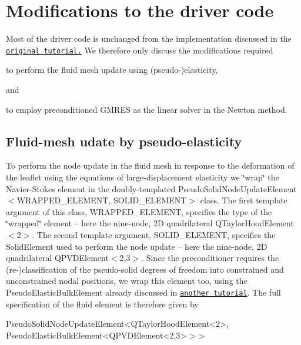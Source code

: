  

\hypertarget{index_modifications}{}\section{Modifications to the driver code}\label{index_modifications}
Most of the driver code is unchanged from the implementation discussed in the \href{../../../interaction/fsi_channel_with_leaflet/html/index.html}{\tt original tutorial.} We therefore only discuss the modifications required
\begin{DoxyItemize}
\item to perform the fluid mesh update using (pseudo-\/)elasticity,
\end{DoxyItemize}and
\begin{DoxyItemize}
\item to employ preconditioned G\+M\+R\+ES as the linear solver in the Newton method.
\end{DoxyItemize}

\hypertarget{index_pseudo-solid}{}\subsection{Fluid-\/mesh udate by pseudo-\/elasticity}\label{index_pseudo-solid}
To perform the node update in the fluid mesh in response to the deformation of the leaflet using the equations of large-\/displacement elasticity we \char`\"{}wrap\char`\"{} the Navier-\/\+Stokes element in the doubly-\/templated {\ttfamily Pseudo\+Solid\+Node\+Update\+Element$<$\+W\+R\+A\+P\+P\+E\+D\+\_\+\+E\+L\+E\+M\+E\+N\+T, S\+O\+L\+I\+D\+\_\+\+E\+L\+E\+M\+E\+N\+T$>$} class. The first template argument of this class, {\ttfamily W\+R\+A\+P\+P\+E\+D\+\_\+\+E\+L\+E\+M\+E\+NT}, specifies the type of the \char`\"{}wrapped\char`\"{} element -- here the nine-\/node, 2D quadrilateral {\ttfamily Q\+Taylor\+Hood\+Element$<$2$>$}. The second template argument, {\ttfamily S\+O\+L\+I\+D\+\_\+\+E\+L\+E\+M\+E\+NT}, specifies the {\ttfamily Solid\+Element} used to perform the node update -- here the nine-\/node, 2D quadrilateral {\ttfamily Q\+P\+V\+D\+Element$<$2,3$>$}. Since the preconditioner requires the (re-\/)classification of the pseudo-\/solid degrees of freedom into constrained and unconstrained nodal positions, we wrap this element too, using the {\ttfamily Pseudo\+Elastic\+Bulk\+Element} already discussed in \href{../../prescribed_displ_lagr_mult/html/index.html}{\tt another tutorial}. The full specification of the fluid element is therefore given by 
\begin{DoxyCode}
PseudoSolidNodeUpdateElement<QTaylorHoodElement<2>,
                             PseudoElasticBulkElement<QPVDElement<2,3> > > 
\end{DoxyCode}




